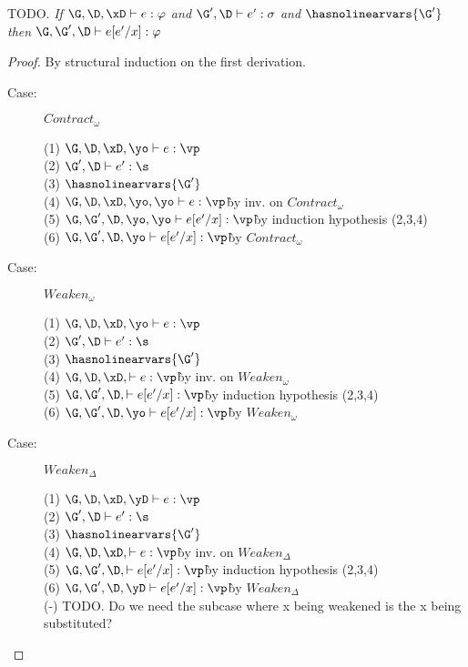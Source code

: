 
\begin{lemma}
  TODO.
\emph{If $\G, \D, \xD \vdash e : \varphi$ and $\G', \D \vdash e' : \sigma$ and $\hasnolinearvars{\G'}$
        then $\G, \G', \D \vdash e[e'/x] : \varphi$}
\end{lemma}
\begin{proof}
By structural induction on the first derivation.

\begin{description}

\item[Case:] $Contract_\omega$
\begin{tabbing}
    (1) $\G, \D, \xD, \yo \vdash e : \vp$\\
    (2) $\G', \D \vdash e' : \s$\\
    (3) $\hasnolinearvars{\G'}$\\
    (4) $\G, \D, \xD, \yo, \yo \vdash e : \vp$\` by inv. on $Contract_\omega$\\
    (5) $\G, \G', \D, \yo, \yo \vdash e[e'/x] : \vp$\` by induction hypothesis (2,3,4)\\
    (6) $\G, \G', \D, \yo \vdash e[e'/x] : \vp$\` by $Contract_\omega$\\
\end{tabbing}

\item[Case:] $Weaken_\omega$
\begin{tabbing}
    (1) $\G, \D, \xD, \yo \vdash e : \vp$\\
    (2) $\G', \D \vdash e' : \s$\\
    (3) $\hasnolinearvars{\G'}$\\
    (4) $\G, \D, \xD, \vdash e : \vp$\` by inv. on $Weaken_\omega$\\
    (5) $\G, \G', \D, \vdash e[e'/x] : \vp$\` by induction hypothesis (2,3,4)\\
    (6) $\G, \G', \D, \yo \vdash e[e'/x] : \vp$\` by $Weaken_\omega$\\
\end{tabbing}

\item[Case:] $Weaken_\Delta$
\begin{tabbing}
    (1) $\G, \D, \xD, \yD \vdash e : \vp$\\
    (2) $\G', \D \vdash e' : \s$\\
    (3) $\hasnolinearvars{\G'}$\\
    (4) $\G, \D, \xD, \vdash e : \vp$\` by inv. on $Weaken_\Delta$\\
    (5) $\G, \G', \D, \vdash e[e'/x] : \vp$\` by induction hypothesis (2,3,4)\\
    (6) $\G, \G', \D, \yD \vdash e[e'/x] : \vp$\` by $Weaken_\Delta$\\
    (-) TODO. Do we need the subcase where x being weakened is the x being
    substituted?\\
\end{tabbing}


\end{description}
\end{proof}
